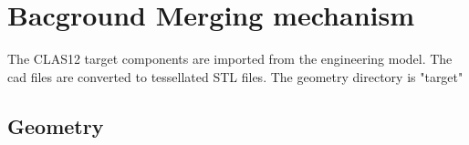 \section{Bacground Merging mechanism}

The CLAS12 target components are imported from the engineering model. The cad files are converted to tessellated STL files.
The geometry directory is "target"

\subsection{Geometry}




